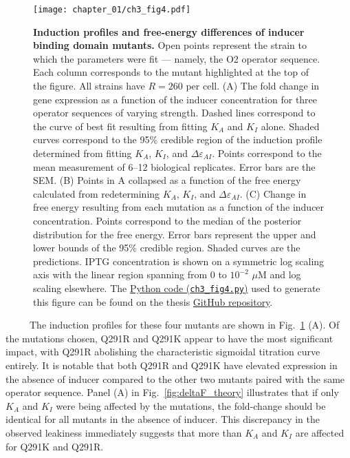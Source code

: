\documentclass[12pt]{caltech_thesis}
\begin{document}
\hypertarget{fig:IND_muts}{%
\begin{figure}
\centering
\texttt{[image: chapter\_01/ch3\_fig4.pdf]}
\caption[{Induction profiles and free-energy differences of inducer
binding domain mutants.}]{\textbf{Induction profiles and free-energy
differences of inducer binding domain mutants.} Open points represent
the strain to which the parameters were fit --- namely, the O2 operator
sequence. Each column corresponds to the mutant highlighted at the top
of the figure. All strains have \(R = 260\) per cell. (A) The fold
change in gene expression as a function of the inducer concentration for
three operator sequences of varying strength. Dashed lines correspond to
the curve of best fit resulting from fitting \(K_A\) and \(K_I\) alone.
Shaded curves correspond to the 95\% credible region of the induction
profile determined from fitting \(K_A\), \(K_I\), and
\(\Delta\varepsilon_{AI}\). Points correspond to the mean measurement of
6--12 biological replicates. Error bars are the SEM. (B) Points in A
collapsed as a function of the free energy calculated from redetermining
\(K_A\), \(K_I\), and \(\Delta\varepsilon_{AI}\). (C) Change in free
energy resulting from each mutation as a function of the inducer
concentration. Points correspond to the median of the posterior
distribution for the free energy. Error bars represent the upper and
lower bounds of the 95\% credible region. Shaded curves are the
predictions. IPTG concentration is shown on a symmetric log scaling axis
with the linear region spanning from 0 to \(10^{-2}\) \(\mu\)M and log
scaling elsewhere. The
\href{https://github.com/gchure/phd/blob/master/src/chapter_03/code/ch3_fig4.py}{Python
code (\texttt{ch3\_fig4.py})} used to generate this figure can be found
on the thesis \href{https://github.com/gchure/phd}{GitHub repository}.}
\label{fig:IND_muts}
\end{figure}
}

~~~~~The induction profiles for these four mutants are shown in
Fig.~\ref{fig:IND_muts} (A). Of the mutations chosen, Q291R and Q291K
appear to have the most significant impact, with Q291R abolishing the
characteristic sigmoidal titration curve entirely. It is notable that
both Q291R and Q291K have elevated expression in the absence of inducer
compared to the other two mutants paired with the same operator
sequence. Panel (A) in Fig.~\ref{fig:deltaF_theory} illustrates that if
only \(K_A\) and \(K_I\) were being affected by the mutations, the
fold-change should be identical for all mutants in the absence of
inducer. This discrepancy in the observed leakiness immediately suggests
that more than \(K_A\) and \(K_I\) are affected for Q291K and Q291R.
\end{document}
